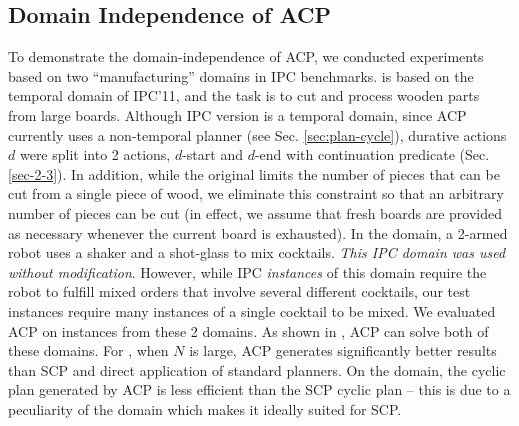 \subsection{Domain Independence of ACP}
To demonstrate the domain-independence of ACP,
we conducted experiments based on two ``manufacturing'' domains in IPC benchmarks.
\ww is based on the temporal domain of IPC'11,
and the task is to cut and process wooden parts from large
boards. Although IPC version is a temporal domain, since ACP
currently uses a non-temporal planner (see Sec. \ref{sec:plan-cycle}), durative actions
$d$ were split into 2 actions, $d$-start and $d$-end with continuation predicate (Sec.\ref{sec-2-3}). In addition,
while the original \ww limits the number of pieces that
can be cut from a single piece of wood, we eliminate this constraint
so that an arbitrary number of pieces can be cut (in effect, we assume
that fresh boards are provided as necessary whenever the current board
is exhausted).
In the \barm domain, a 2-armed robot uses a shaker and a shot-glass to mix cocktails. {\em This IPC domain was used without modification}. However, while IPC {\em instances} of this domain require the robot to fulfill mixed orders that involve several different cocktails, our test instances require many instances of a single cocktail to be mixed.
We evaluated ACP on instances from these 2 domains. As shown in , ACP can 
solve both of these domains. For \ww, when $N$ is large, ACP generates significantly better results than SCP and direct application of standard planners.
On the \barm domain, the cyclic plan generated by ACP is less efficient than the SCP cyclic plan -- this is due to a peculiarity of the \barm domain which makes it ideally suited for SCP.

